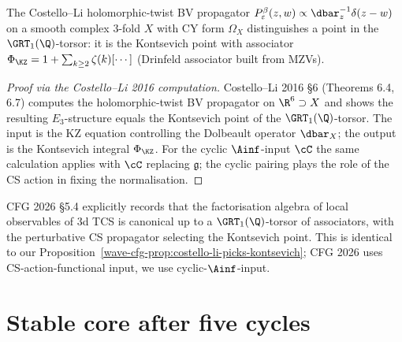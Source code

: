 \begin{proposition}
\label{wave-cfg-prop:costello-li-picks-kontsevich}
The Costello--Li holomorphic-twist BV propagator
$P_\varepsilon^\beta(z,w)\propto\dbar_z^{-1}\delta(z-w)$ on a smooth
complex $3$-fold $X$ with CY form $\Omega_X$ distinguishes a point in
the $\GRT_1(\Q)$-torsor: it is the Kontsevich point with associator
$\Phi_{\KZ}=1+\sum_{k\geq 2}\zeta(k)[\cdots]$ (Drinfeld associator
built from MZVs).
\end{proposition}

\begin{proof}[Proof via the Costello--Li 2016 computation]
Costello--Li 2016 \S 6 (Theorems 6.4, 6.7) computes the
holomorphic-twist BV propagator on $\R^6\supset X$ and shows the
resulting $E_3$-structure equals the Kontsevich point of the
$\GRT_1(\Q)$-torsor. The input is the KZ equation controlling the
Dolbeault operator $\dbar_X$; the output is the Kontsevich integral
$\Phi_{\KZ}$. For the cyclic $\Ainf$-input $\cC$ the same calculation
applies with $\cC$ replacing $\mathfrak g$; the cyclic pairing plays
the role of the CS action in fixing the normalisation.
\end{proof}

\begin{remark}
\label{wave-cfg-rem:a5-cfg}
CFG 2026 \S 5.4 explicitly records that the factorisation algebra of
local observables of $3$d TCS is canonical up to a $\GRT_1(\Q)$-torsor
of associators, with the perturbative CS propagator selecting the
Kontsevich point. This is identical to our
Proposition~\ref{wave-cfg-prop:costello-li-picks-kontsevich}; CFG 2026
uses CS-action-functional input, we use cyclic-$\Ainf$-input.
\end{remark}

\section*{Stable core after five cycles}

